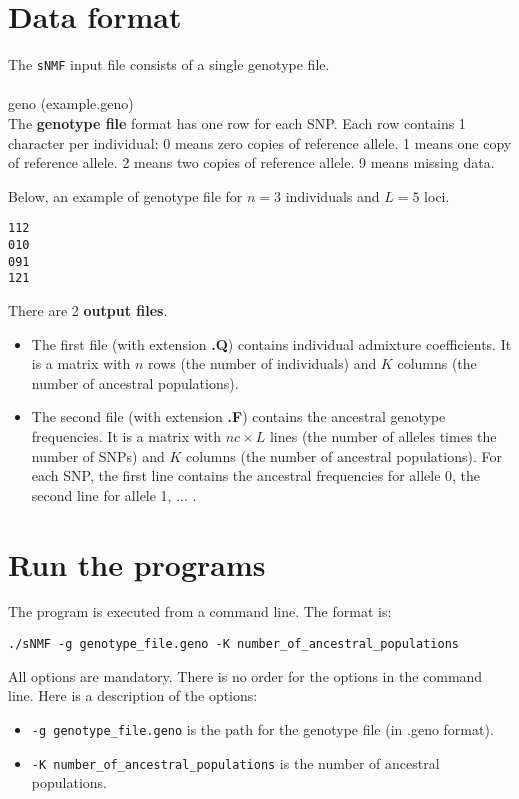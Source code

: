 \documentclass[10pt,a4paper]{article}
\begin{document}
\section{Data format}

The {\tt sNMF} input file consists of a single genotype file. 
\\
\\
geno (example.geno)\\
The {\bf genotype file} format has one row for each SNP.
  Each row contains 1 character per individual:
  0 means zero copies of reference allele.
  1 means one copy of reference allele.
  2 means two copies of reference allele.
  9 means missing data.

Below, an example of genotype file for $n=3$ individuals and $L=5$ loci.
\begin{center}
\footnotesize
\begin{Verbatim}[frame=single]
112
010
091
121
\end{Verbatim}
\end{center}

\noindent
There are 2 {\bf output files}.

\begin{itemize}
\item The first file (with extension {\bf .Q}) contains individual admixture coefficients.
It is a matrix with $n$ rows (the number of individuals) and $K$ columns (the 
number of ancestral populations).
\item The second file (with extension {\bf .F}) contains the ancestral genotype frequencies.
It is a matrix with $nc\times L$ lines (the number of alleles times the number of SNPs) and $K$ columns (the 
number of ancestral populations). For each SNP, the first line contains the ancestral frequencies for allele 0, the second line for allele 1, ... .
\end{itemize}

\section{Run the programs}
The program is executed from a command line. The format is:
\begin{Verbatim}[frame=single]
./sNMF -g genotype_file.geno -K number_of_ancestral_populations 
\end{Verbatim}

\noindent
All options are mandatory. There is no order for the options in the command line. 
Here is a description of the options:
\begin{itemize}
\item \verb|-g genotype_file.geno| is the path for the genotype file (in .geno format).
\item \verb|-K number_of_ancestral_populations| is the number of ancestral populations. 
\end{itemize}
\end{document}
